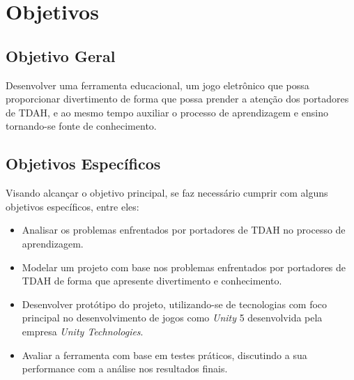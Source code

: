 \documentclass[
	12pt,				%
    oneside,			%
	a4paper,			%
	english,			%
	french,				%
	spanish,			%
	brazil,				%
	]{abntex2}
\begin{document}
	\section{Objetivos}

		\subsection{Objetivo Geral}
		
			Desenvolver uma ferramenta educacional, um jogo eletrônico que possa proporcionar divertimento de forma que possa prender a atenção dos portadores de TDAH, e ao mesmo tempo auxiliar o processo de aprendizagem e ensino tornando-se fonte de conhecimento.
			
		\subsection{Objetivos Específicos}
			Visando alcançar o objetivo principal, se faz necessário cumprir com alguns objetivos específicos, entre eles:
			
			\begin{itemize}
				\item Analisar os problemas enfrentados por portadores de TDAH no processo de aprendizagem.
				
				\item Modelar um projeto com base nos problemas enfrentados por portadores de TDAH de forma que apresente divertimento e conhecimento.
				
				\item Desenvolver protótipo do projeto, utilizando-se de tecnologias com foco principal no desenvolvimento de jogos como \textit{Unity} 5 desenvolvida pela empresa \textit{Unity Technologies}.
				
				\item Avaliar a ferramenta com base em testes práticos, discutindo a sua performance com a análise nos resultados finais.
			\end{itemize}
			
		
\end{document}
